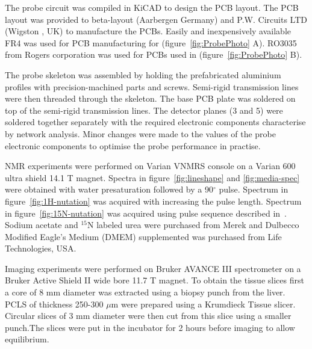 \documentclass[preprint,12pt]{article}
\begin{document}
The probe circuit was compiled in KiCAD to design the PCB layout. The PCB layout was provided to beta-layout (Aarbergen Germany) and P.W. Circuits LTD (Wigston , UK) to manufacture the PCBs. Easily and inexpensively available FR4 was used for PCB manufacturing for (figure~\ref{fig:ProbePhoto} A). RO3035 from Rogers corporation was used for PCBs used in (figure~\ref{fig:ProbePhoto} B).\par
The probe skeleton was assembled by holding the prefabricated aluminium profiles with precision-machined parts and screws. Semi-rigid transmission lines were then threaded through the skeleton. The base PCB plate was soldered on top of the semi-rigid transmission lines. The detector planes (3 and 5) were soldered together separately with the required electronic components characterise by network analysis. Minor changes were made to the values of the probe electronic components to optimise the probe performance in practise.\par
NMR experiments were performed on Varian VNMRS console on a Varian 600 ultra shield 14.1 T magnet. Spectra in figure~\ref{fig:lineshape} and \ref{fig:media-spec} were obtained with water presaturation followed by a 90$^{\circ}$ pulse. Spectrum in figure~\ref{fig:1H-nutation} was acquired with increasing the pulse length. Spectrum in figure~\ref{fig:15N-nutation} was acquired using pulse sequence described in~\cite{bax_indirect}. Sodium acetate and $^{15}$N labeled urea were purchased from Merek and Dulbecco Modified Eagle's Medium (DMEM) supplemented was purchased from Life Technologies, USA.\par
Imaging experiments were performed on Bruker AVANCE III spectrometer on a Bruker Active Shield II wide bore 11.7 T magnet. To obtain the tissue slices first a core of 8 mm diameter was extracted using a biopsy punch from the liver. PCLS of thickness 250-300 $\mu$m were prepared using a Krumdieck Tissue slicer. Circular slices of 3 mm diameter were then cut from this slice using a smaller punch.The slices were put in the incubator for 2 hours before imaging to allow equilibrium.
\end{document}
